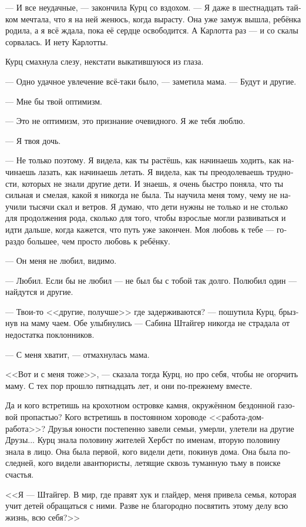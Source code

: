 \documentclass[a4paper,10pt,fleqn]{book}\usepackage{polyglossia}\setdefaultlanguage[babelshorthands=true]{russian}\setotherlanguage{english}\defaultfontfeatures{Ligatures=TeX,Mapping=tex-text}\usepackage{xcolor}\newcommand{\ml}[3]{#2}
\begin{document}
--- И все неудачные, --- закончила Курц со вздохом.
--- Я даже в шестнадцать тайком мечтала, что я на ней женюсь, когда вырасту.
Она уже замуж вышла, ребёнка родила, а я всё ждала, пока её сердце освободится.
А Карлотта раз --- и со скалы сорвалась.
И нету Карлотты.

Курц смахнула слезу, некстати выкатившуюся из глаза.

--- Одно удачное увлечение всё-таки было, --- заметила мама.
--- Будут и другие.

--- Мне бы твой оптимизм.

--- Это не оптимизм, это признание очевидного.
Я же тебя люблю.

--- Я твоя дочь.

--- Не только поэтому.
Я видела, как ты растёшь, как начинаешь ходить, как начинаешь лазать, как начинаешь летать.
Я видела, как ты преодолеваешь трудности, которых не знали другие дети.
И знаешь, я очень быстро поняла, что ты сильная и смелая, какой я никогда не была.
Ты научила меня тому, чему не научили тысячи скал и ветров.
Я думаю, что дети нужны не только и не столько для продолжения рода, сколько для того, чтобы взрослые могли развиваться и идти дальше, когда кажется, что путь уже закончен.
Моя любовь к тебе --- гораздо большее, чем просто любовь к ребёнку.

--- Он меня не любил, видимо.

--- Любил.
Если бы не любил --- не был бы с тобой так долго.
Полюбил один --- найдутся и другие.

--- Твои-то <<другие, получше>> где задерживаются? --- пошутила Курц, брызнув на маму чаем.
Обе улыбнулись --- Сабина Штайгер никогда не страдала от недостатка поклонников.

--- С меня хватит, --- отмахнулась мама.

<<Вот и с меня тоже>>, --- сказала тогда Курц, но про себя, чтобы не огорчить маму.
С тех пор прошло пятнадцать лет, и они по-прежнему вместе.

Да и кого встретишь на крохотном островке камня, окружённом бездонной газовой пропастью?
Кого встретишь в постоянном хороводе <<работа-дом-работа>>?
Друзья юности постепенно завели семьи, умерли, улетели на другие Друзы...
Курц знала половину жителей Хербст по именам, вторую половину знала в лицо.
Она была первой, кого видели дети, покинув дома.
Она была последней, кого видели авантюристы, летящие сквозь туманную тьму в поиске счастья.

<<Я --- Штайгер.
В мир, где правят хук и глайдер, меня привела семья, которая учит детей обращаться с ними.
Разве не благородно посвятить этому делу всю жизнь, всю себя?>>
\end{document}
